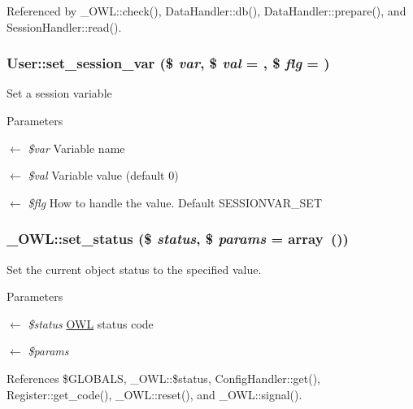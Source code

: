 Referenced by \_\-OWL::check(), DataHandler::db(), DataHandler::prepare(), and SessionHandler::read().

\subsubsection[{set\_\-session\_\-var}]{\setlength{\rightskip}{0pt plus 5cm}User::set\_\-session\_\-var (\$ {\em var}, \/  \$ {\em val} = {}, \/  \$ {\em flg} = {})}\label{classUser_a80108765c46ddec1ab776a774ae07f53}
Set a session variable


\begin{DoxyParams}{Parameters}
\item[\mbox{$\leftarrow$} {\em \$var}]Variable name \item[\mbox{$\leftarrow$} {\em \$val}]Variable value (default 0) \item[\mbox{$\leftarrow$} {\em \$flg}]How to handle the value. Default SESSIONVAR\_\-SET \end{DoxyParams}
\subsubsection[{set\_\-status}]{\setlength{\rightskip}{0pt plus 5cm}\_\-OWL::set\_\-status (\$ {\em status}, \/  \$ {\em params} = {\ttfamily array~()})}\label{class__OWL_aea912d0ede9b3c2a69b79072d94d4787}
Set the current object status to the specified value.


\begin{DoxyParams}{Parameters}
\item[\mbox{$\leftarrow$} {\em \$status}]\hyperlink{classOWL}{OWL} status code \item[\mbox{$\leftarrow$} {\em \$params}]\end{DoxyParams}


References \$GLOBALS, \_\-OWL::\$status, ConfigHandler::get(), Register::get\_\-code(), \_\-OWL::reset(), and \_\-OWL::signal().



